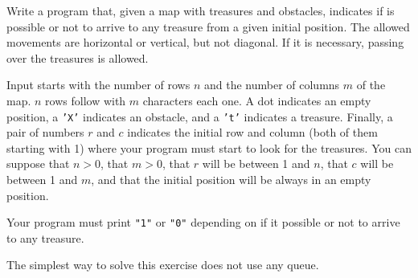 

\Statement

Write a program that, given a map with treasures and obstacles,
indicates if is possible or not to arrive to any treasure
from a given initial position.
The allowed movements are horizontal or vertical,
but not diagonal.
If it is necessary, passing over the treasures is allowed.


\Input

Input starts with the number of rows $n$ and the number of columns $m$ of the map.
$n$ rows follow with $m$ characters each one.
A dot indicates an empty position,
a \texttt{'X'} indicates an obstacle,
and a \texttt{'t'} indicates a treasure.
Finally, a pair of numbers $r$ and $c$
indicates the initial row and column (both of them starting with 1)
where your program must start to look for the treasures.
You can suppose that $n > 0$, that $m > 0$,
that $r$ will be between 1 and $n$, that $c$ will be between 1 and $m$,
and that the initial position will be always in an empty position.


\Output

Your program must print \texttt{"1"} or \texttt{"0"}
depending on if it possible or not to arrive to any treasure.


\Observation

The simplest way to solve this exercise does not use any queue.


\SampleTwoCol
